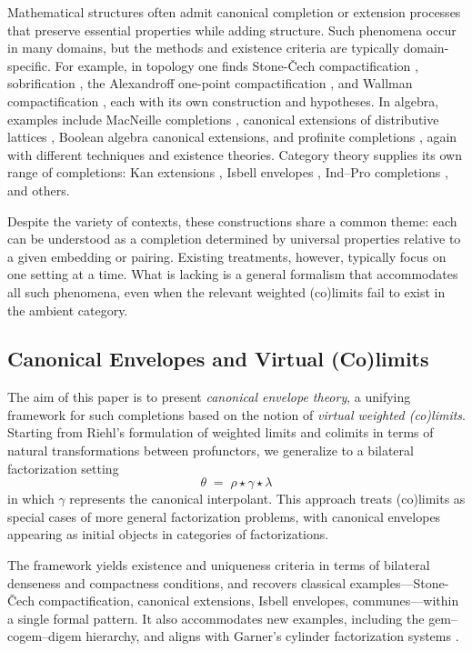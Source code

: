 \documentclass[11pt]{article}
\theoremstyle{plain}
\theoremstyle{definition}
\theoremstyle{remark}
\begin{document}
Mathematical structures often admit canonical completion or extension processes that preserve essential properties while adding structure. Such phenomena occur in many domains, but the methods and existence criteria are typically domain-specific. For example, in topology one finds Stone-\v{C}ech compactification \cite{stone1936theory}, sobrification \cite{johnstone1982stone}, the Alexandroff one-point compactification \cite{alexandroff1924point}, and Wallman compactification \cite{wallman1938lattices}, each with its own construction and hypotheses.  
In algebra, examples include MacNeille completions \cite{macneille1937extension}, canonical extensions of distributive lattices \cite{jonsson1951boolean}, Boolean algebra canonical extensions, and profinite completions \cite{pontryagin1966topological}, again with different techniques and existence theories.  
Category theory supplies its own range of completions: Kan extensions \cite{kan1958adjoint}, Isbell envelopes \cite{isbell1960adequate}, Ind--Pro completions \cite{gabriel1971categories}, and others.

Despite the variety of contexts, these constructions share a common theme: each can be understood as a completion determined by universal properties relative to a given embedding or pairing.  
Existing treatments, however, typically focus on one setting at a time.  
What is lacking is a general formalism that accommodates all such phenomena, even when the relevant weighted (co)limits fail to exist in the ambient category.

\subsection{Canonical Envelopes and Virtual (Co)limits}

The aim of this paper is to present \emph{canonical envelope theory}, a unifying framework for such completions based on the notion of \emph{virtual weighted (co)limits}.  
Starting from Riehl's formulation of weighted limits and colimits in terms of natural transformations between profunctors, we generalize to a bilateral factorization setting
$$
\theta \;=\; \rho \star \gamma \star \lambda
$$
in which $\gamma$ represents the canonical interpolant.  
This approach treats (co)limits as special cases of more general factorization problems, with canonical envelopes appearing as initial objects in categories of factorizations.

The framework yields existence and uniqueness criteria in terms of bilateral denseness and compactness conditions, and recovers classical examples---Stone-\v{C}ech compactification, canonical extensions, Isbell envelopes, communes---within a single formal pattern.  
It also accommodates new examples, including the gem--cogem--digem hierarchy, and aligns with Garner's cylinder factorization systems \cite{garner2018cylinder}.
\end{document}
